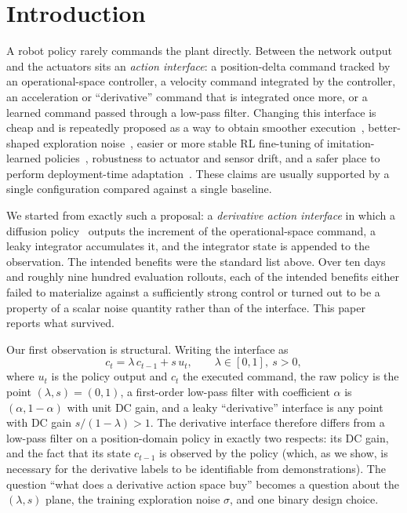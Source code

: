 \documentclass[conference]{IEEEtran}
\begin{document}
\begin{abstract}
\end{abstract}

\section{Introduction}

A robot policy rarely commands the plant directly. Between the network output and the actuators sits an \emph{action interface}: a position-delta command tracked by an operational-space controller, a velocity command integrated by the controller, an acceleration or ``derivative'' command that is integrated once more, or a learned command passed through a low-pass filter. Changing this interface is cheap and is repeatedly proposed as a way to obtain smoother execution~\cite{raffin2021smoothexplorationroboticreinforcement}, better-shaped exploration noise~\cite{eberhard2023pink}, easier or more stable RL fine-tuning of imitation-learned policies~\cite{ren2024diffusionpolicypolicyoptimization,li2026reinforcementlearningactionchunking}, robustness to actuator and sensor drift, and a safer place to perform deployment-time adaptation~\cite{muttaqien2026orpaonlineresidualpolicy,wagenmaker2025steeringdiffusionpolicylatent}. These claims are usually supported by a single configuration compared against a single baseline.

We started from exactly such a proposal: a \emph{derivative action interface} in which a diffusion policy~\cite{chi2023diffusionpolicy} outputs the increment of the operational-space command, a leaky integrator accumulates it, and the integrator state is appended to the observation. The intended benefits were the standard list above. Over ten days and roughly nine hundred evaluation rollouts, each of the intended benefits either failed to materialize against a sufficiently strong control or turned out to be a property of a scalar noise quantity rather than of the interface. This paper reports what survived.

Our first observation is structural. Writing the interface as
\begin{equation}
c_t=\lambda\,c_{t-1}+s\,u_t,\qquad \lambda\in[0,1],\ s>0,
\label{eq:filter}
\end{equation}
where $u_t$ is the policy output and $c_t$ the executed command, the raw policy is the point $(\lambda,s)=(0,1)$, a first-order low-pass filter with coefficient $\alpha$ is $(\alpha,1-\alpha)$ with unit DC gain, and a leaky ``derivative'' interface is any point with DC gain $s/(1-\lambda)>1$. The derivative interface therefore differs from a low-pass filter on a position-domain policy in exactly two respects: its DC gain, and the fact that its state $c_{t-1}$ is observed by the policy (which, as we show, is necessary for the derivative labels to be identifiable from demonstrations). The question ``what does a derivative action space buy'' becomes a question about the $(\lambda,s)$ plane, the training exploration noise $\sigma$, and one binary design choice.
\end{document}
